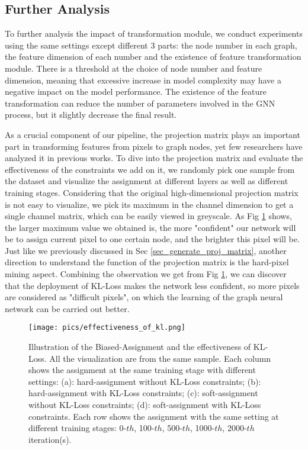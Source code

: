 ﻿\documentclass[journal]{IEEEtran}
\begin{document}
    \subsection{Further Analysis}\label{sec_sub_further}
    To further analysis the impact of transformation module, we conduct experiments using the same settings except different 3 parts: the node number in each graph, the feature dimension of each number and the existence of feature transformation module. There is a threshold at the choice of node number and feature dimension, meaning that excessive increase in model complexity may have a negative impact on the model performance. The existence of the feature transformation can reduce the number of parameters involved in the GNN process, but it slightly decrease the final result. 

    As a crucial component of our pipeline, the projection matrix plays an important part in transforming features from pixels to graph nodes, yet few researchers have analyzed it in previous works. To dive into the projection matrix and evaluate the effectiveness of the constraints we add on it, we randomly pick one sample from the dataset and visualize the assignment at different layers as well as different training stages. Considering that the original high-dimensional projection matrix is not easy to visualize, we pick its maximum in the channel dimension to get a single channel matrix, which can be easily viewed in greyscale. As Fig \ref{fig_biased_assignment} shows, the larger maximum value we obtained is, the more "confident" our network will be to assign current pixel to one certain node, and the brighter this pixel will be. Just like we previously discussed in Sec \ref{sec_generate_proj_matrix}, another direction to understand the function of the projection matrix is the hard-pixel mining aspect. Combining the observation we get from Fig \ref{fig_biased_assignment}, we can discover that the deployment of KL-Loss makes the network less confident, so more pixels are considered as "difficult pixels", on which the learning of the graph neural network can be carried out better.



\begin{figure}
    \centering
    \texttt{[image: pics/effectiveness\_of\_kl.png]}
    \caption{Illustration of the Biased-Assignment and the effectiveness of KL-Loss. All the visualization are from the same sample. Each column shows the assignment at the same training stage with different settings: (a): hard-assignment without KL-Loss constraints; (b): hard-assignment with KL-Loss constraints; (c): soft-assignment without KL-Loss constraints; (d): soft-assignment with KL-Loss constraints. Each row shows the assignment with the same setting at different training stages: 0-$th$, 100-$th$, 500-$th$, 1000-$th$, 2000-$th$ iteration(s).  }
    \label{fig_biased_assignment}
\end{figure} 
\end{document}
